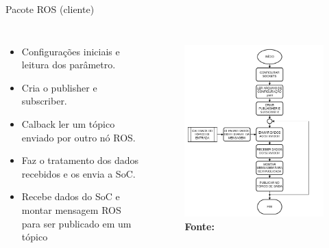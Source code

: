 \documentclass[10pt]{beamer}
\begin{document}
\begin{frame}{Pacote ROS (cliente)}
	\begin{alertblock}{}
		\begin{columns}
			\begin{itemize}
				\setlength\itemsep{0.6em}
				\item Configurações iniciais e leitura dos parâmetro.
				\item Cria o publisher e subscriber.
				\item Calback ler um tópico enviado por outro nó ROS.
				\item Faz o tratamento dos dados recebidos e os envia a SoC.
				\item Recebe dados do SoC e montar mensagem ROS para ser publicado em um tópico
			\end{itemize}
			\begin{figure}[h]
				\begin{center}
					\includegraphics[scale=0.24]{imagens/fluxogramaCliente.png}\\
					{\footnotesize \textbf{Fonte:}}
				\end{center}
				\label{fig:cliente}
			\end{figure}
		\end{columns}
	\end{alertblock}
\end{frame}
\end{document}
